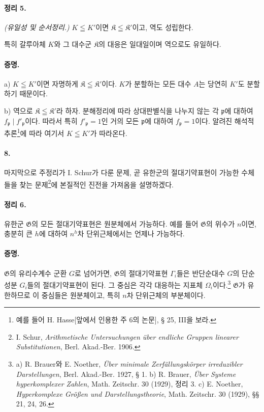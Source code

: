\paragraph{정리 5.}
\emph{(유일성 및 순서정리.)} \(K\leqq K'\)이면 \(\mathfrak K\leqq\mathfrak K'\)이고, 역도 성립한다.

특히 갈루아체 \(K\)와 그 대수군 \(\mathfrak K\)의 대응은 일대일이며 역으로도 유일하다.

\paragraph{증명.}
a) \(K\leqq K'\)이면 자명하게 \(\mathfrak K\leqq\mathfrak K'\)이다. \(K\)가 분할하는 모든 대수 \(A\)는 당연히 \(K'\)도 분할하기 때문이다.

b) 역으로 \(\mathfrak K\leqq\mathfrak K'\)라 하자. 분해정리에 따라 상대판별식을 나누지 않는 각 \(\mathfrak p\)에 대하여 \(f_{\mathfrak p}\mid f'_{\mathfrak p}\)이다. 따라서 특히 \(f'_{\mathfrak p}=1\)인 거의 모든 \(\mathfrak p\)에 대하여 \(f_{\mathfrak p}=1\)이다. 알려진 해석적 추론\footnote{예를 들어 H. Hasse[앞에서 인용한 주 6의 논문], § 25, III을 보라.}에 따라 여기서 \(K\leqq K'\)가 따라온다.

\paragraph{8.}
마지막으로 주정리가 I. Schur가 다룬 문제, 곧 유한군의 절대기약표현이 가능한 수체들을 찾는 문제\footnote{I. Schur, \emph{Arithmetische Untersuchungen über endliche Gruppen linearer Substitutionen}, Berl. Akad.-Ber. 1906.}에 본질적인 진전을 가져옴을 설명하겠다.

\paragraph{정리 6.}
유한군 \(\mathfrak G\)의 모든 절대기약표현은 원분체에서 가능하다. 예를 들어 \(\mathfrak G\)의 위수가 \(n\)이면, 충분히 큰 \(h\)에 대하여 \(n^h\)차 단위근체에서는 언제나 가능하다.

\paragraph{증명.}
\(\mathfrak G\)의 유리수계수 군환 \(G\)로 넘어가면, \(\mathfrak G\)의 절대기약표현 \(\Gamma_i\)들은 반단순대수 \(G\)의 단순 성분 \(G_i\)들의 절대기약표현이 된다. 그 중심은 각각 대응하는 지표체 \(\Omega_i\)이다.\footnote{a) R. Brauer와 E. Noether, \emph{Über minimale Zerfällungskörper irreduzibler Darstellungen}, Berl. Akad.-Ber. 1927, § 1. b) R. Brauer, \emph{Über Systeme hyperkomplexer Zahlen}, Math. Zeitschr. 30 (1929), 정리 3. c) E. Noether, \emph{Hyperkomplexe Größen und Darstellungstheorie}, Math. Zeitschr. 30 (1929), §§ 21, 24, 26.} \(\mathfrak G\)가 유한하므로 이 중심들은 원분체이고, 특히 \(n\)차 단위근체의 부분체이다.

